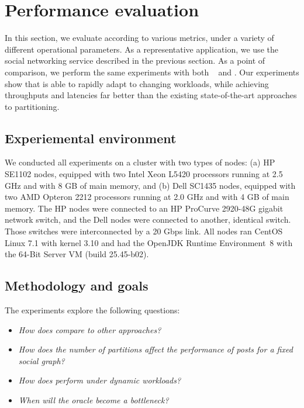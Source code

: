 \section{Performance evaluation}
\label{sec:experiments}

In this section, we evaluate \dynastar{} according to various metrics,
under a variety of different operational parameters.  As a
representative application, we use the \appname{} social networking
service described in the previous section.  As a point of comparison,
we perform the same experiments with both
\ssmr{}~\cite{bezerra2014ssmr} and \dssmr. Our experiments show that
\dynastar{} is able to rapidly adapt to changing workloads, while
achieving throughputs and latencies far better than the existing
state-of-the-art approaches to partitioning.


\subsection{Experiemental environment}
\label{sec:evaluation:setup}

We conducted all experiments on a cluster with two types of nodes: (a)
HP SE1102 nodes, equipped with two Intel Xeon L5420 processors running
at 2.5 GHz and with 8 GB of main memory, and (b) Dell SC1435 nodes,
equipped with two AMD Opteron 2212 processors running at 2.0 GHz and
with 4 GB of main memory. The HP nodes were connected to an HP
ProCurve 2920-48G gigabit network switch, and the Dell nodes were
connected to another, identical switch. Those switches were
interconnected by a 20 Gbps link.  All nodes ran CentOS Linux 7.1 with
kernel 3.10 and had the OpenJDK Runtime Environment~8 with the
\mbox{64-Bit} Server VM (build 25.45-b02).


\subsection{Methodology and goals}
\label{sec:evaluation:methodology}

The experiments explore the following questions:
\begin{itemize}
\item \emph{How does \dynastar compare to other approaches?} 
\item \emph{How does the number of partitions affect the performance of posts for a fixed social graph?}
\item \emph{How does \dynastar perform under dynamic workloads?}
\item \emph{When will the oracle become a bottleneck?}
\end{itemize}



